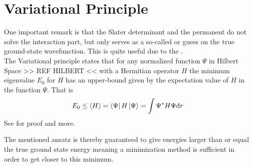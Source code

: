 \section{Variational Principle\label{sec:varPrinc}}
    One important remark is that the Slater determinant and the permanent do
    not solve the interaction part, but only serves as a so-called
     or guess on the true ground-state wavefunction. This is
    quite useful due to the . \\
    The Variational principle states that for any normalized function $\Psi$ in
    Hilbert Space >> REF HILBERT << with a Hermitian operator $H$ the minimum
    eigenvalue $E_0$ for $H$ has an upper-bound given by the expectation value
    of $H$ in the function $\Psi$. That is
        \begin{equation}
            E_0 \leq \left< {H} \right> = \bra{\Psi}H\ket{\Psi} = \int \Psi^{*}H\Psi \mathrm{d} r
            \label{eq:varPrinc}
        \end{equation}
    See \cite{GriffQuan} for proof and more.

    The mentioned ansatz is thereby guaranteed to give energies larger than or
    equal the true ground state energy meaning a minimization method is
    sufficient in order to get closer to this minimum. 
   
